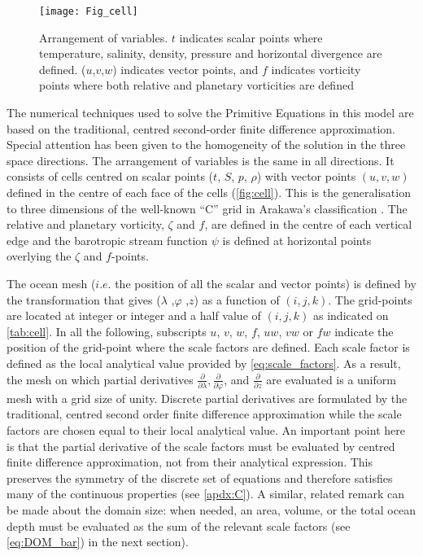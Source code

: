 \documentclass[../tex_main/NEMO_manual]{subfiles}
\begin{document}
\begin{figure}[!tb]    \begin{center}
\texttt{[image: Fig\_cell]}
\caption{ \protect\label{fig:cell}    
Arrangement of variables. $t$ indicates scalar points where temperature, 
salinity, density, pressure and horizontal divergence are defined. ($u$,$v$,$w$) 
indicates vector points, and $f$ indicates vorticity points where both relative and 
planetary vorticities are defined}
\end{center}   \end{figure}

The numerical techniques used to solve the Primitive Equations in this model are 
based on the traditional, centred second-order finite difference approximation. 
Special attention has been given to the homogeneity of the solution in the three 
space directions. The arrangement of variables is the same in all directions. 
It consists of cells centred on scalar points ($t$, $S$, $p$, $\rho$) with vector 
points $(u, v, w)$ defined in the centre of each face of the cells (\autoref{fig:cell}). 
This is the generalisation to three dimensions of the well-known ``C'' grid in 
Arakawa's classification \citep{Mesinger_Arakawa_Bk76}. The relative and 
planetary vorticity, $\zeta$ and $f$, are defined in the centre of each vertical edge 
and the barotropic stream function $\psi$ is defined at horizontal points overlying 
the $\zeta$ and $f$-points.

The ocean mesh ($i.e.$ the position of all the scalar and vector points) is defined 
by the transformation that gives ($\lambda$ ,$\varphi$ ,$z$) as a function of $(i,j,k)$. 
The grid-points are located at integer or integer and a half value of $(i,j,k)$ as 
indicated on \autoref{tab:cell}. In all the following, subscripts $u$, $v$, $w$, 
$f$, $uw$, $vw$ or $fw$ indicate the position of the grid-point where the scale 
factors are defined. Each scale factor is defined as the local analytical value 
provided by \autoref{eq:scale_factors}. As a result, the mesh on which partial 
derivatives $\frac{\partial}{\partial \lambda}, \frac{\partial}{\partial \varphi}$, and 
$\frac{\partial}{\partial z} $ are evaluated is a uniform mesh with a grid size of unity. 
Discrete partial derivatives are formulated by the traditional, centred second order 
finite difference approximation while the scale factors are chosen equal to their 
local analytical value. An important point here is that the partial derivative of the 
scale factors must be evaluated by centred finite difference approximation, not 
from their analytical expression. This preserves the symmetry of the discrete set 
of equations and therefore satisfies many of the continuous properties (see 
\autoref{apdx:C}). A similar, related remark can be made about the domain 
size: when needed, an area, volume, or the total ocean depth must be evaluated 
as the sum of the relevant scale factors (see \autoref{eq:DOM_bar}) in the next section). 
\end{document}
